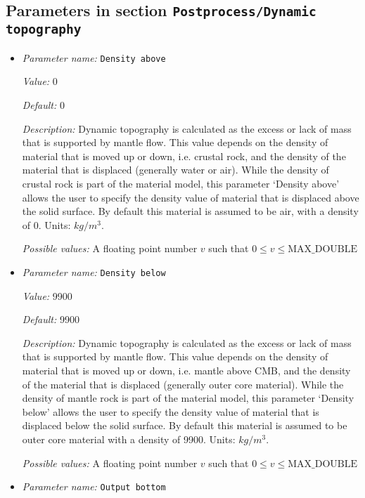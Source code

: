 \subsection{Parameters in section \tt Postprocess/Dynamic topography}
\label{parameters:Postprocess/Dynamic_20topography}

\begin{itemize}
\item {\it Parameter name:} {\tt Density above}
\label{parameters:Postprocess/Dynamic topography/Density above}


{\it Value:} 0


{\it Default:} 0


{\it Description:} Dynamic topography is calculated as the excess or lack of mass that is supported by mantle flow. This value depends on the density of material that is moved up or down, i.e. crustal rock, and the density of the material that is displaced (generally water or air). While the density of crustal rock is part of the material model, this parameter `Density above' allows the user to specify the density value of material that is displaced above the solid surface. By default this material is assumed to be air, with a density of 0. Units: $kg/m^3$.


{\it Possible values:} A floating point number $v$ such that $0 \leq v \leq \text{MAX\_DOUBLE}$
\item {\it Parameter name:} {\tt Density below}
\label{parameters:Postprocess/Dynamic topography/Density below}


{\it Value:} 9900


{\it Default:} 9900


{\it Description:} Dynamic topography is calculated as the excess or lack of mass that is supported by mantle flow. This value depends on the density of material that is moved up or down, i.e. mantle above CMB, and the density of the material that is displaced (generally outer core material). While the density of mantle rock is part of the material model, this parameter `Density below' allows the user to specify the density value of material that is displaced below the solid surface. By default this material is assumed to be outer core material with a density of 9900. Units: $kg/m^3$.


{\it Possible values:} A floating point number $v$ such that $0 \leq v \leq \text{MAX\_DOUBLE}$
\item {\it Parameter name:} {\tt Output bottom}
\label{parameters:Postprocess/Dynamic topography/Output bottom}



\end{itemize}

